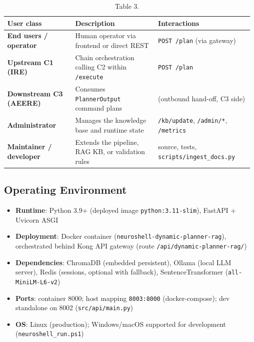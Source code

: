 \documentclass[10pt,journal,onecolumn]{IEEEtran}
\begin{document}
\begin{table}[h]
\caption{Table 3.}
\label{tab:t3}
\begin{tabularx}{\columnwidth}{l >{\raggedright\arraybackslash}X >{\raggedright\arraybackslash}X}
\toprule
\textbf{User class} & \textbf{Description} & \textbf{Interactions}\\
\midrule
\textbf{End users / operator} & Human operator via frontend or direct REST & \texttt{POST /plan} (via gateway)\\
\textbf{Upstream C1 (IRE)} & Chain orchestration calling C2 within \texttt{/execute} & \texttt{POST /plan}\\
\textbf{Downstream C3 (AEERE)} & Consumes \texttt{PlannerOutput} command plans & (outbound hand-off, C3 side)\\
\textbf{Administrator} & Manages the knowledge base and runtime state & \texttt{/kb/update}, \texttt{/admin/*}, \texttt{/metrics}\\
\textbf{Maintainer / developer} & Extends the pipeline, RAG KB, or validation rules & source, tests, \texttt{scripts/ingest\_docs.py}\\
\bottomrule
\end{tabularx}
\end{table}

\subsection{Operating Environment}

\begin{itemize}
\item \textbf{Runtime}: Python 3.9+ (deployed image \texttt{python:3.11-slim}), FastAPI + Uvicorn ASGI
\item \textbf{Deployment}: Docker container (\texttt{neuroshell-\allowbreak dynamic-\allowbreak planner-\allowbreak rag}), orchestrated behind Kong API gateway (route \texttt{/\allowbreak api/\allowbreak dynamic-\allowbreak planner-\allowbreak rag/\allowbreak *})
\item \textbf{Dependencies}: ChromaDB (embedded persistent), Ollama (local LLM server), Redis (sessions, optional with fallback), SentenceTransformer (\texttt{all-MiniLM-L6-v2})
\item \textbf{Ports}: container 8000; host mapping \texttt{8003:8000} (docker-compose); dev standalone on 8002 (\texttt{src/api/main.py})
\item \textbf{OS}: Linux (production); Windows/macOS supported for development (\texttt{neuroshell\_run.ps1})
\end{itemize}
\end{document}
